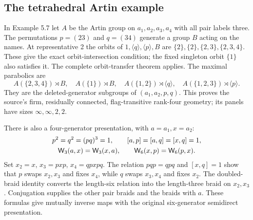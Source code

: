 \subsection{The tetrahedral Artin example}
In Example 5.7 let $A$ be the Artin group on $a_1,a_2,a_3,a_4$
with all pair labels three. The permutations $p=(23)$ and $q=(34)$ generate a group $B$ acting on the names. At representative 2 the orbits of
$1,\langle q\rangle,\langle p\rangle,B$ are
$\{2\},\{2\},\{2,3\},\{2,3,4\}$. These give the exact
orbit-intersection condition; the fixed singleton orbit $\{1\}$
also satisfies it. The complete orbit-transfer theorem applies.
The maximal parabolics are
\[
 A(\{2,3,4\})\rtimes B,\quad A(\{1\})\rtimes B,\quad
 A(\{1,2\})\rtimes\langle q\rangle,\quad
 A(\{1,2,3\})\rtimes\langle p\rangle.
\]
They are the deleted-generator subgroups of $(a_1,a_2,p,q)$.
This proves the source's firm, residually connected, flag-transitive
rank-four geometry; its panels have sizes $\infty,\infty,2,2$.

There is also a four-generator presentation, with $a=a_1,x=a_2$:
\[
 \begin{gathered}
 p^2=q^2=(pq)^3=1,\qquad [a,p]=[a,q]=[x,q]=1,\\
 \mathsf W_3(a,x)=\mathsf W_3(x,a),\qquad\mathsf W_6(x,p)=\mathsf W_6(p,x).
 \end{gathered}
\]
Set $x_2=x$, $x_3=pxp$, $x_4=qpxpq$. The relation $pqp=qpq$
and $[x,q]=1$ show that $p$ swaps $x_2,x_3$ and fixes $x_4$,
while $q$ swaps $x_3,x_4$ and fixes $x_2$.
The doubled-braid identity converts the length-six relation into
the length-three braid on $x_2,x_3$. Conjugation supplies the other
pair braids and the braids with $a$. These formulas give mutually
inverse maps with the original six-generator semidirect presentation.
